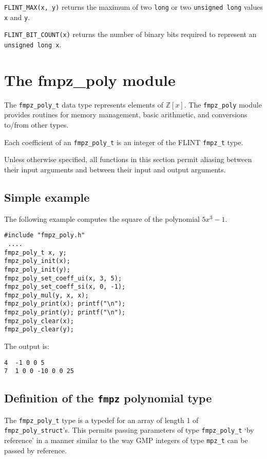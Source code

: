 \documentclass[a4paper,10pt]{article}
\newcommand{\Z}{\mathbb{Z}}
\newcommand{\code}{\lstinline}
\begin{document}
\code{FLINT_MAX(x, y)} returns the maximum of two \code{long} or two \code{unsigned long} values \code{x} and \code{y}.

\code{FLINT_BIT_COUNT(x)} returns the number of binary bits required to represent an \code{unsigned long x}.

\section{The fmpz\_poly module}

The \code{fmpz_poly_t} data type represents elements of $\Z[x]$. The \code{fmpz_poly} module provides routines for memory management, basic arithmetic, and conversions to/from other types.

Each coefficient of an \code{fmpz_poly_t} is an integer of the FLINT \code{fmpz_t} type. 

Unless otherwise specified, all functions in this section permit aliasing between their input arguments and between their input and output arguments. 

\subsection{Simple example}

The following example computes the square of the polynomial $5x^3 - 1$.

\begin{lstlisting}
#include "fmpz_poly.h"
 ....
fmpz_poly_t x, y;
fmpz_poly_init(x);
fmpz_poly_init(y);
fmpz_poly_set_coeff_ui(x, 3, 5);
fmpz_poly_set_coeff_si(x, 0, -1);
fmpz_poly_mul(y, x, x);
fmpz_poly_print(x); printf("\n");
fmpz_poly_print(y); printf("\n");
fmpz_poly_clear(x);
fmpz_poly_clear(y);
\end{lstlisting}

The output is:

\begin{lstlisting}
4  -1 0 0 5
7  1 0 0 -10 0 0 25
\end{lstlisting}

\subsection{Definition of the \code{fmpz} polynomial type}

The \code{fmpz_poly_t} type is a typedef for an array of length 1 of \code{fmpz_poly_struct}'s. This permits passing parameters  of type \code{fmpz_poly_t} `by reference' in a manner similar to the way GMP integers of type \code{mpz_t} can be passed by reference. 
\end{document}
